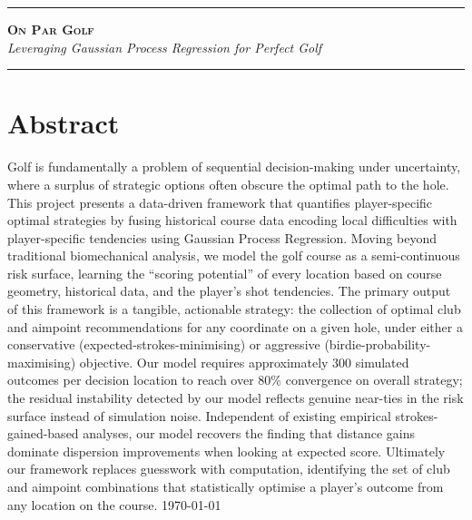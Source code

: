 \documentclass[11pt, letterpaper]{article}
\begin{document}
\begin{titlepage}
   \begingroup 
    \centering
    \vspace*{2.5cm}
    
    \rule{\textwidth}{1.5pt}\vspace{0.5cm}
    
    {\huge \bfseries \scshape On Par Golf} \\
    \vspace{0.3cm}
    {\Large \itshape Leveraging Gaussian Process Regression for Perfect Golf} %
    
    \vspace{0.5cm}
    \rule{\textwidth}{1.5pt}
    
    \vspace{3cm}
   \endgroup 
    
    \section*{Abstract}
    \noindent
       Golf is fundamentally a problem of sequential decision-making under uncertainty, where a surplus of strategic options often obscure the optimal path to the hole. This project presents a data-driven framework that quantifies player-specific optimal strategies by fusing historical course data encoding local difficulties with player-specific tendencies using Gaussian Process Regression. Moving beyond traditional biomechanical analysis, we model the golf course as a semi-continuous risk surface, learning the ``scoring potential'' of every location based on course geometry, historical data, and the player's shot tendencies. The primary output of this framework is a tangible, actionable strategy: the collection of optimal club and aimpoint recommendations for any coordinate on a given hole, under either a conservative (expected-strokes-minimising) or aggressive (birdie-probability-maximising) objective. Our model requires approximately 300 \verify simulated outcomes per decision location to reach over 80\% convergence on overall strategy; the residual instability detected by our model reflects genuine near-ties in the risk surface instead of simulation noise. Independent of existing empirical strokes-gained-based analyses, our model recovers the finding that distance gains dominate dispersion improvements when looking at expected score. Ultimately our framework replaces guesswork with computation, identifying the set of club and aimpoint combinations that statistically optimise a player's outcome from any location on the course.
    \vfill
    \today
\end{titlepage}
\end{document}
